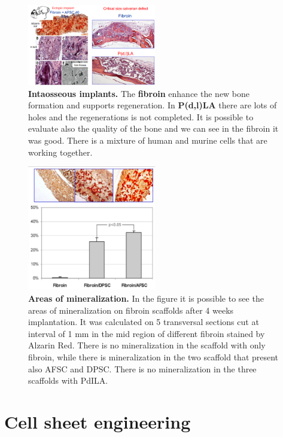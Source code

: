     \begin{figure}[H]
        \centering
        \includegraphics[width=0.5\textwidth]{intraosseous_implants.png}
    \caption{\label{fig:intraosseous_implants} \textbf{Intaosseous implants.} The \textbf{fibroin} enhance the new bone formation and supports regeneration. In \textbf{P(d,l)LA} there are lots of holes and the regenerations is not completed. It is possible to evaluate also the quality of the bone and we can see in the fibroin it was good. There is a mixture of human and murine cells that are working together.}
    \end{figure}

    \begin{figure}[H]
        \centering
        \includegraphics[width=0.5\textwidth]{mineralization.png}
    \caption{\label{fig:mineralization} \textbf{Areas of mineralization.} In the figure it is possible to see the areas of mineralization on fibroin scaffolds after 4 weeks implantation. It was calculated on 5 transversal sections cut at interval of 1 mm in the mid region of different fibroin stained by Alzarin Red. There is no mineralization in the scaffold with only fibroin, while there is mineralization in the two scaffold that present also AFSC and DPSC. There is no mineralization in the three scaffolds with PdILA.}
    \end{figure}

\section{Cell sheet engineering}

